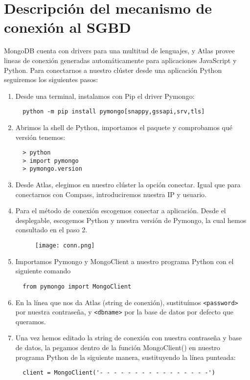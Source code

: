 \chapter{Descripción del mecanismo de conexión al SGBD}
MongoDB cuenta con drivers para una multitud de lenguajes, y Atlas provee lineas de conexión generadas automáticamente para aplicaciones JavaScript y Python. Para conectarnos a nuestro clúster desde una aplicación Python seguiremos los siguientes pasos:

\begin{enumerate}
  \item Desde una terminal, instalamos con Pip el driver Pymongo:
  \begin{lstlisting}
  python -m pip install pymongo[snappy,gssapi,srv,tls]
  \end{lstlisting}

  \item Abrimos la shell de Python, importamos el paquete y comprobamos qué versión tenemos:
  \begin{lstlisting}
  > python
  > import pymongo
  > pymongo.version
  \end{lstlisting}

  \item Desde Atlas, elegimos en nuestro clúster la opción conectar. Igual que para conectarnos con Compass, introduciremos nuestra IP y usuario.

  \item Para el método de conexión escogemos conectar a aplicación. Desde el desplegable, escogemos Python y nuestra versión de Pymongo, la cual hemos consultado en el paso 2.
    \begin{figure}[!h]
      \centering
        \texttt{[image: conn.png]}
    \end{figure}

  \item Importamos Pymongo y MongoClient a nuestro programa Python con el siguiente comando
  \begin{lstlisting}
  from pymongo import MongoClient
  \end{lstlisting}

  \item En la línea que nos da Atlas (string de conexión), sustituímos \texttt{<password>} por nuestra contraseña, y \texttt{<dbname>} por la base de datos por defecto que queramos.

  \item Una vez hemos editado la string de conexión con nuestra contraseña y base de datos, la pegamos dentro de la función MongoClient() en nuestro programa Python de la siguiente manera, sustituyendo la línea punteada:
  \begin{lstlisting}
  client = MongoClient('- - - - - - - - - - - - - - - -')
  \end{lstlisting}

\end{enumerate}
